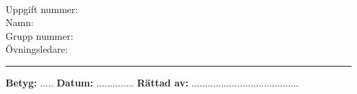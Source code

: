 \thispagestyle{empty}

\textbf{\large\course\ \coursename}

\begin{description}
\item[Uppgift nummer:] \assignmentnr
\item[Namn:] \theauthor
\item[Grupp nummer:] \groupnr
\item[Övningsledare:] \courseleader
\end{description}

\rule[0.5ex]{1\columnwidth}{1pt}

\textbf{Betyg:} ..... \hfill \textbf{Datum:} .............. \hfill \textbf{Rättad
av:} ........................................